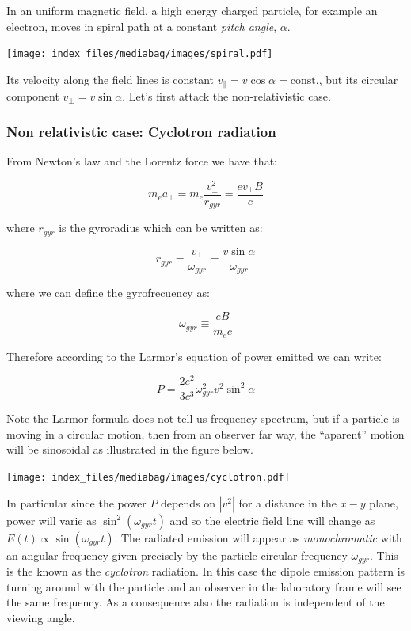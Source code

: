 \documentclass[
  letterpaper,
  DIV=11,
  numbers=noendperiod]{scrreprt}
\begin{document}
In an uniform magnetic field, a high energy charged particle, for
example an electron, moves in spiral path at a constant \emph{pitch
angle}, \(\alpha\).

\texttt{[image: index\_files/mediabag/images/spiral.pdf]}

Its velocity along the field lines is constant
\(v_{\parallel} = v \cos\alpha = \mathrm{const.}\), but its circular
component \(v_\perp = v\sin\alpha\). Let's first attack the
non-relativistic case.

\subsubsection{Non relativistic case: Cyclotron
radiation}\label{non-relativistic-case-cyclotron-radiation}

From Newton's law and the Lorentz force we have that:

\[ m_e a_\perp = m_e \frac{v_\perp^2}{r_{gyr}} = \frac{e v_\perp B}{c}\]

where \(r_{gyr}\) is the gyroradius which can be written as:

\[r_{gyr} = \frac{v_\perp}{\omega_{gyr}} = \frac{v\sin\alpha}{\omega_{gyr}}\]

where we can define the gyrofrecuency as:

\[\omega_{gyr} \equiv \frac{eB}{m_e c}\]

Therefore according to the Larmor's equation of power emitted we can
write:

\[P = \frac{2 e^2}{3c^3} \omega_{gyr}^2 v^2\sin^2\alpha\]

Note the Larmor formula does not tell us frequency spectrum, but if a
particle is moving in a circular motion, then from an observer far way,
the ``aparent'' motion will be sinosoidal as illustrated in the figure
below.

\texttt{[image: index\_files/mediabag/images/cyclotron.pdf]}

In particular since the power \(P\) depends on \(|v^2|\) for a distance
in the \(x-y\) plane, power will varie as \(\sin^2(\omega_{gyr}t)\) and
so the electric field line will change as
\(E(t)\propto \sin(\omega_{gyr}t)\). The radiated emission will appear
as \emph{monochromatic} with an angular frequency given precisely by the
particle circular frequency \(\omega_{gyr}\). This is the known as the
\emph{cyclotron} radiation. In this case the dipole emission pattern is
turning around with the particle and an observer in the laboratory frame
will see the same frequency. As a consequence also the radiation is
independent of the viewing angle.
\end{document}
